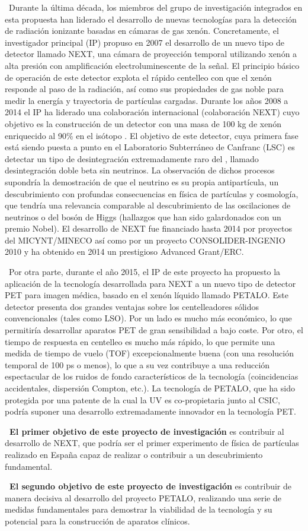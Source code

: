 ~Durante la última década, los miembros del grupo de investigación integrados en esta propuesta han liderado el desarrollo de nuevas tecnologías para la detección de radiación ionizante basadas en cámaras de gas xenón. Concretamente, el investigador principal (IP) propuso en 2007 el desarrollo de un nuevo tipo de detector llamado NEXT, una cámara de proyección temporal utilizando xenón a alta presión con amplificación electroluminescente de la señal. El principio básico de operación de este detector explota el rápido centelleo con que el xenón responde al paso de la radiación, así como sus propiedades de gas noble para medir la energía y trayectoria de partículas cargadas. Durante los años 2008 a 2014 el IP  ha liderado una colaboración internacional (colaboración NEXT) cuyo objetivo es la construcción de un detector con una masa de 100 kg de xenón enriquecido al 90\% en el isótopo \XE. El objetivo de este detector, cuya primera fase está siendo puesta a punto en el Laboratorio Subterráneo de Canfranc (LSC) es detectar un tipo de desintegración extremadamente raro del \XE, llamado desintegración doble beta sin neutrinos. La observación de dichos procesos supondría la demostración de que el neutrino es su propia antipartícula, un descubrimiento con profundas consecuencias en física de partículas y cosmología, que tendría una relevancia comparable al descubrimiento de las oscilaciones de neutrinos o del bosón de Higgs (hallazgos que han sido galardonados con un premio Nobel). El desarrollo de NEXT fue financiado hasta 2014 por proyectos del MICYNT/MINECO así como por un proyecto CONSOLIDER-INGENIO 2010 y ha obtenido en 2014 un prestigioso Advanced Grant/ERC. 

~Por otra parte, durante el año 2015, el IP de este proyecto ha propuesto la aplicación de la tecnología desarrollada para NEXT a un nuevo tipo de detector PET para imagen médica, basado en el xenón líquido llamado PETALO. Este detector presenta dos grandes ventajas sobre los centelleadores sólidos convencionales (tales como LSO). Por un lado es mucho más económico, lo que permitiría desarrollar aparatos PET de gran sensibilidad a bajo coste. Por otro, el tiempo de respuesta en centelleo es mucho más rápido, lo que permite una medida de tiempo de vuelo (TOF) excepcionalmente buena (con una resolución temporal de 100 ps o menos), lo que a su vez contribuye a una reducción espectacular de los ruidos de fondo característicos de la tecnología (coincidencias accidentales, dispersión Compton, etc.). La tecnología de PETALO, que ha sido protegida por una patente de la cual la UV es co-propietaria junto al CSIC, podría suponer una desarrollo extremadamente innovador en la tecnología PET.
 

{\bf ~El primer objetivo de este proyecto de investigación} es contribuir al desarrollo de NEXT, que podría ser el primer experimento de física de partículas realizado en España capaz de realizar o contribuir a un descubrimiento fundamental. 

{\bf ~El segundo objetivo de este proyecto de investigación} es contribuir de manera decisiva al desarrollo del proyecto PETALO, realizando una serie de medidas fundamentales para demostrar la viabilidad de la tecnología y su potencial para la construcción de aparatos clínicos. 